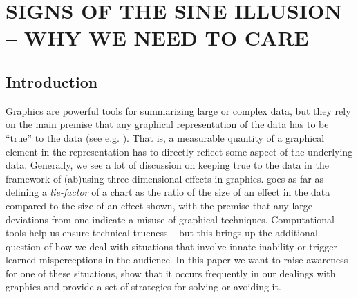 \documentclass[11pt]{isuthesis}\usepackage[]{graphicx}\usepackage[]{color}
\begin{document}
\graphicspath{{Figure/sineIllusion/}{Images/sineIllusion/}}
\renewcommand{\floatpagefraction}{.99}

\newcommand{\range}[1]{{\text{range}\left(#1\right)}}
\newcommand{\s}[2]{{_{#1}s^{ #2}}}
\newcommand{\atan}[1]{\text{atan}\left({#1}\right)}
\newcommand{\xR}{\mathbb{R}}









\chapter{SIGNS OF THE SINE ILLUSION -- WHY WE NEED TO CARE}\label{SineIllusionChapter}\label{sineillusion}


\section{Introduction}
Graphics are powerful tools for summarizing large or complex data, but they rely on the main premise that any graphical representation of the data has to be ``true'' to the data (see e.g. \citet{tufte, wainer:2000, robbins:2005}). That is, a measurable quantity of a graphical element in the representation has to  directly reflect some aspect of the underlying data. Generally, we see a lot of discussion on keeping true to the data in the framework of (ab)using three dimensional effects in graphics. \cite{tufte} goes as far as defining a {\it lie-factor} of a chart as the ratio of the size of an effect in the data compared to the size of an effect shown, with the premise that any large deviations from one indicate a misuse of graphical techniques. Computational tools help us ensure technical trueness -- but this brings up the additional question of how we deal with situations that involve innate inability or trigger learned misperceptions in the audience. In this paper we want to raise awareness for one of these situations, show that it occurs frequently in our dealings with graphics and provide a set of strategies for solving or avoiding it.
\end{document}
